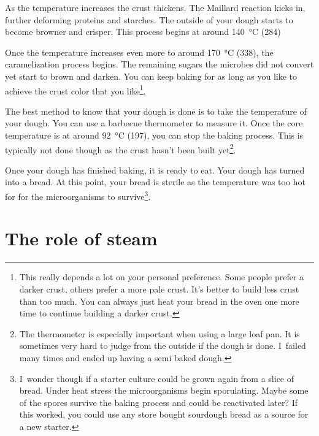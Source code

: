 As the temperature increases
the crust thickens. The Maillard reaction kicks in, further deforming
proteins and starches. The outside of your dough starts to become
browner and crisper. This process begins at around  \qty{140}{\degreeCelsius} (\qty{284}{\degF})

Once the temperature increases even more to around  \qty{170}{\degreeCelsius} (\qty{338}{\degF}),
the caramelization process begins. The remaining sugars the microbes
did not convert yet start to brown and darken. You can keep baking
for as long as you like to achieve the crust color that you
like\footnote{This really depends a lot on your personal preference.
Some people prefer a darker crust, others prefer a more pale crust.
It's better to build less crust than too much. You can always just
heat your bread in the oven one more time to continue building a
darker crust.}.

The best method to know that your dough is done is to take
the temperature of your dough. You can use a barbecue thermometer
to measure it. Once the core temperature is at around  \qty{92}{\degreeCelsius} (\qty{197}{\degF}),
you can stop the baking process. This is typically not done though
as the crust hasn't been built yet\footnote{The thermometer is
especially important when using a large loaf pan. It is sometimes
very hard to judge from the outside if the dough is done. I~failed
many times and ended up having a semi baked dough.}.

Once your dough has finished baking, it is ready to eat. Your
dough has turned into a bread. At this
point, your bread is sterile as the temperature was too hot for
for the microorganisms to survive\footnote{I~wonder though
if a starter culture could be grown again from a slice of bread.
Under heat stress the microorganisms begin sporulating. Maybe
some of the spores survive the baking process and could be reactivated
later? If this worked, you could use any store bought sourdough
bread as a source for a new starter.}.

\section{The role of steam}

